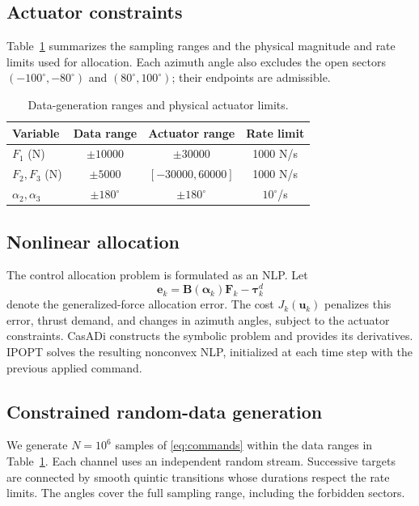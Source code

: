 \documentclass[conference]{IEEEtran}
\newcommand{\ud}{\bm{u}}
\newcommand{\taud}{\bm{\tau}^{d}}
\begin{document}
\subsection{Actuator constraints}
Table~\ref{tab:bounds} summarizes the sampling ranges and the physical
magnitude and rate limits used for allocation. Each azimuth angle also
excludes the open sectors $(-100^\circ,-80^\circ)$ and
$(80^\circ,100^\circ)$; their endpoints are admissible.

\begin{table}[t]
\caption{Data-generation ranges and physical actuator limits.}
\label{tab:bounds}
\centering
\setlength{\tabcolsep}{4pt}
\begin{tabular}{lccc}
\toprule
Variable&Data range&Actuator range&Rate limit\\
\midrule
$F_1$ (N)&$\pm10000$&$\pm30000$&1000 N/s\\
$F_2,F_3$ (N)&$\pm5000$&$[-30000,60000]$&1000 N/s\\
$\alpha_2,\alpha_3$&$\pm180^\circ$&$\pm180^\circ$&$10^\circ$/s\\
\bottomrule
\end{tabular}
\end{table}

\subsection{Nonlinear allocation}
The control allocation problem is formulated as an NLP. Let
\begin{equation}
 \bm e_k=\bm B(\bm\alpha_k)\bm F_k-\taud_k
\end{equation}
denote the generalized-force allocation error. The cost $J_k(\ud_k)$
penalizes this error, thrust demand, and changes in azimuth angles, subject
to the actuator constraints. CasADi constructs the symbolic problem and
provides its derivatives. IPOPT solves the resulting nonconvex NLP,
initialized at each time step with the previous applied command.

\subsection{Constrained random-data generation}
We generate $N=10^6$ samples of \eqref{eq:commands} within the data ranges
in Table~\ref{tab:bounds}. Each channel uses an independent random stream.
Successive targets are connected by smooth quintic transitions whose
durations respect the rate limits. The angles cover the full sampling
range, including the forbidden sectors.
\end{document}
